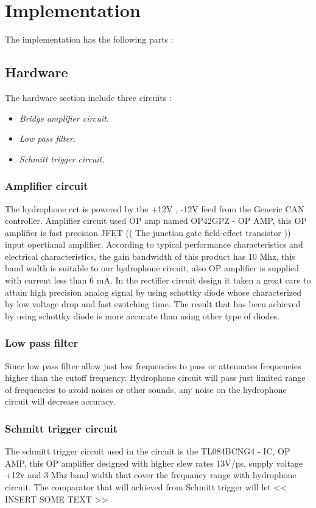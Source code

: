 \section{Implementation}\label{sec:implementation}
The implementation has the following parts :

\subsection{Hardware}
The hardware section include three circuits :
\begin{itemize}
   \item { \em Bridge amplifier circuit.}
   \item { \em Low pass filter. }
   \item { \em Schmitt trigger circuit. }
\end{itemize}
\subsubsection{Amplifier circuit }
The hydrophone cct is powered by the +12V , -12V feed from the Generic CAN controller. Amplifier circuit used OP amp named OP42GPZ - OP AMP, this OP amplifier is fast precision JFET (( The junction gate field-effect transistor )) input opertianal amplifier.
According to typical performance characteristics and electrical characteristics, the gain bandwidth of this product has 10 Mhz, this band width is suitable to our hydrophone circuit, also OP amplifier is supplied with current less than 6 mA.
In the rectifier circuit design it taken a great care to attain high precision analog signal by using   schottky diode whose characterized by low voltage drop and fast switching time.
The result that has been achieved by using schottky diode is more accurate than using other type of diodes.  

\subsubsection{Low pass filter}
Since low pass filter allow just low frequencies to pass or attenuates frequencies higher than the cutoff frequency.
Hydrophone circuit will pass just limited range of frequencies to avoid noises or other sounds, any noise on the hydrophone circuit will decrease accuracy.    
 
 \subsubsection{Schmitt trigger  circuit}
The schmitt trigger circuit used in the circuit is the TL084BCNG4 - IC, OP AMP, this OP amplifier designed with higher slew rates 13V/µs, supply voltage +12v and 3 Mhz band width that cover the frequancy range with hydrophone circuit. 
The comparator that will achieved from Schmitt trigger will let << INSERT SOME TEXT >> 
 
